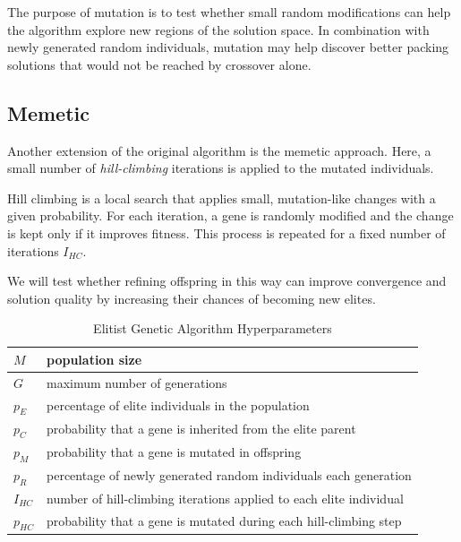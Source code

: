The purpose of mutation is to test whether small random modifications can help the algorithm explore new regions of the solution space. 
In combination with newly generated random individuals, mutation may help discover better packing solutions that would not be reached by crossover alone.

\subsection{Memetic}

Another extension of the original algorithm is the memetic approach.
Here, a small number of \emph{hill-climbing} iterations is applied to the mutated individuals.

Hill climbing is a local search that applies small, mutation-like changes with a given probability.
For each iteration, a gene is randomly modified and the change is kept only if it improves fitness. 
This process is repeated for a fixed number of iterations $I_{HC}$.

We will test whether refining offspring in this way can improve convergence and solution quality by increasing their chances of becoming new elites.

\begin{table}[htbp]
\centering
\caption{Elitist Genetic Algorithm Hyperparameters}
\label{tab:ega-hyperparameters}
\begin{tabular}{|l|l|}
\hline
$M$ & population size \\ \hline
$G$ & maximum number of generations \\ \hline
$p_E$ & percentage of elite individuals in the population \\ \hline
$p_C$ & probability that a gene is inherited from the elite parent \\ \hline
$p_M$ & probability that a gene is mutated in offspring \\ \hline
$p_R$ & percentage of newly generated random individuals each generation \\ \hline
$I_{HC}$ & number of hill-climbing iterations applied to each elite individual \\ \hline
$p_{HC}$ & probability that a gene is mutated during each hill-climbing step \\ \hline
\end{tabular}
\end{table}

